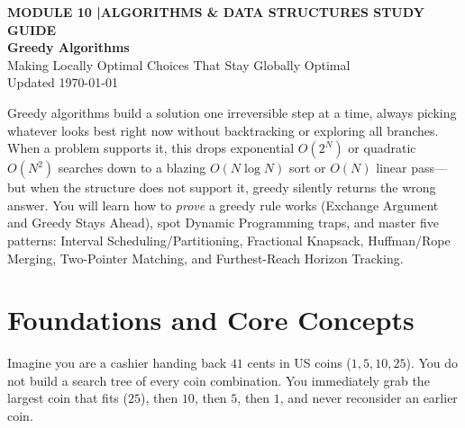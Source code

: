 \documentclass[11pt,a4paper]{article}
\newcommand{\sectionbreak}{}
\theoremstyle{definition}
\begin{document}
\thispagestyle{plain}
\begin{tcolorbox}[
    enhanced,
    colback=primaryblue!6, colframe=primaryblue!20,
    borderline west={5pt}{0pt}{primaryblue},
    arc=4pt, boxrule=0.6pt,
    left=14pt, right=14pt, top=8pt, bottom=8pt,
    before skip=0pt, after skip=6pt
]
    {\footnotesize\bfseries\color{accentteal}MODULE 10 \quad|\quad ALGORITHMS \& DATA STRUCTURES STUDY GUIDE}\\[4pt]
    {\Huge\bfseries\color{primaryblue}Greedy Algorithms}\\[4pt]
    {\large\color{codegray}Making Locally Optimal Choices That Stay Globally Optimal}\\[5pt]
    {\footnotesize\color{codegray}Updated \today}
\end{tcolorbox}

\begin{overviewbox}
Greedy algorithms build a solution one irreversible step at a time, always picking whatever looks best right now without backtracking or exploring all branches. When a problem supports it, this drops exponential $O(2^N)$ or quadratic $O(N^2)$ searches down to a blazing $O(N \log N)$ sort or $O(N)$ linear pass---but when the structure does not support it, greedy silently returns the wrong answer. You will learn how to \emph{prove} a greedy rule works (Exchange Argument and Greedy Stays Ahead), spot Dynamic Programming traps, and master five patterns: Interval Scheduling/Partitioning, Fractional Knapsack, Huffman/Rope Merging, Two-Pointer Matching, and Furthest-Reach Horizon Tracking.
\end{overviewbox}

\vspace{-4pt}
{\setlength{\parskip}{0pt}\small\tableofcontents}

\renewcommand{\sectionbreak}{\clearpage}

\section{Foundations and Core Concepts}

Imagine you are a cashier handing back $41$ cents in US coins ($1, 5, 10, 25$). You do not build a search tree of every coin combination. You immediately grab the largest coin that fits ($25$), then $10$, then $5$, then $1$, and never reconsider an earlier coin.
\end{document}
